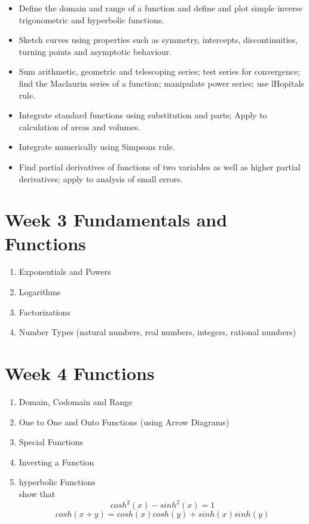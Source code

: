 \documentclass[]{article}
\begin{document}
\begin{itemize}
\item Define the domain and range of a function and define and plot simple inverse trigonometric and hyperbolic functions. 
\item Sketch curves using properties such as symmetry, intercepts, discontinuities, turning points and asymptotic behaviour. 
\item Sum arithmetic, geometric and telescoping series; test series for convergence; find the Maclaurin series of a function; manipulate power series; use lHopitals rule.
\item Integrate standard functions using substitution and parts; Apply to calculation of areas and volumes. 
\item Integrate numerically using Simpsons rule. 
\item Find partial derivatives of functions of two variables as well as higher partial derivatives; apply to analysis of small errors.
\end{itemize}

\newpage
\section{Week 3 Fundamentals and Functions}
\begin{enumerate}
	\item Exponentials and Powers
	\item Logarithms
	\item Factorizations
	\item Number Types (natural numbers, real numbers, integers, rational numbers)
\end{enumerate}
\newpage
\section{Week 4 Functions}
\begin{enumerate}
	\item Domain, Codomain and Range
	\item One to One and Onto Functions (using Arrow Diagrams)
	\item Special Functions
	\item Inverting a Function
	\item hyperbolic Functions \\ show that \[ cosh^2(x) - sinh^2(x) = 1\]
	\[ cosh(x+y) = cosh(x)cosh(y) + sinh(x)sinh(y)\]
\end{enumerate}
\end{document}
